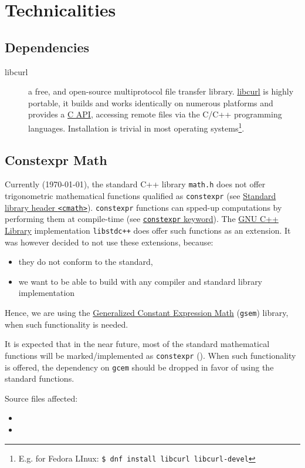 \chapter{Technicalities}
\label{ch:technicalities}

\section{Dependencies}
\begin{description}
    \item [libcurl] a free, and open-source multiprotocol file transfer library.
    \href{https://curl.se/libcurl/}{libcurl} is highly portable, it builds and works 
    identically on numerous platforms and provides a \href{https://curl.se/libcurl/c/}{C API}, 
    accessing remote files via the C/C++ programming languages. Installation is 
    trivial in most operating systems\footnote{E.g. for Fedora LInux: \lstinline[language=bash]|$ dnf install libcurl libcurl-devel|}.

\end{description}

\section{Constexpr Math}
Currently (\today), the standard C++ library \texttt{math.h} does not offer trigonometric mathematical 
functions qualified as \texttt{constexpr} (see \href{https://en.cppreference.com/w/cpp/header/cmath}{Standard library header \texttt{<cmath>}}).
\texttt{constexpr} functions can spped-up computations by performing them at compile-time 
(see \href{https://en.cppreference.com/w/cpp/language/constexpr}{\texttt{constexpr} keyword}). 
The \href{https://gcc.gnu.org/onlinedocs/libstdc++/}{GNU C++ Library} implementation \texttt{libstdc++} 
does offer such functions as an extension. It was however decided to not use these 
extensions, because:
\begin{itemize}
    \item they do not conform to the standard,
    \item we want to be able to build with any compiler and standard library implementation
\end{itemize}

Hence, we are using the \href{https://www.kthohr.com/gcem.html}{Generalized Constant Expression Math} 
(\texttt{gsem}) library, when such functionality is needed.

It is expected that in the near future, most of the standard mathematical functions 
will be marked/implemented as \texttt{constexpr} (\cite{rostencpp}). When such functionality is 
offered, the dependency on \texttt{gcem} should be dropped in favor of using the standard 
functions.

Source files affected:
\begin{itemize}
    \item {}
    \item {}
\end{itemize}

